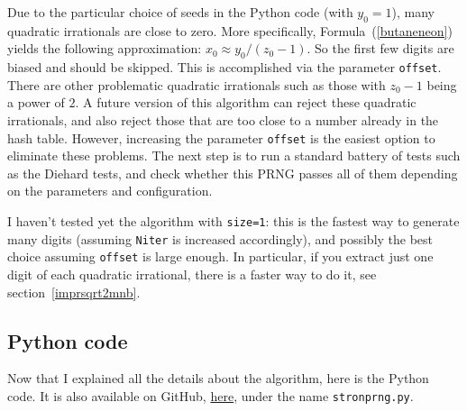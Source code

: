 \documentclass[oneside,10pt]{book}
\begin{document}
Due to the particular choice of seeds in the Python code (with $y_0=1$), many quadratic irrationals are close to zero. More specifically,
 Formula~(\ref{butaneneon}) yields the following approximation: $x_0\approx  y_0/(z_0-1)$.
 So the first few digits are biased and should be skipped. This is accomplished via the parameter \texttt{offset}. There are
 other problematic quadratic irrationals such as those with $z_0-1$ being a power of $2$. A future version of this algorithm can reject these quadratic irrationals, and also reject those that are too close to a number already in the hash table. However, increasing the parameter \texttt{offset} is the easiest option to eliminate these problems. The next step is to run
 a standard battery of tests such as the \textcolor{index}{Diehard tests},  and check whether this PRNG passes all of them depending on the parameters and configuration.

I haven't tested yet
 the algorithm with \texttt{size=1}: this is the fastest way to generate many digits (assuming \texttt{Niter} is increased
 accordingly), and possibly the best choice assuming \texttt{offset} is large enough. In particular, if you extract just one digit of each quadratic irrational, there is a faster way to do it, see section~\ref{imprsqrt2mnb}.

\subsection{Python code}\label{tr3te4}

Now that I explained all the details about the algorithm, here is the Python code. It is also available
 on GitHub, \href{https://github.com/VincentGranville/Experimental-Math-Number-Theory/blob/main/Source-Code/strongprng.py}{here}, under the name \texttt{stronprng.py}.    \vspace{1ex}
\end{document}
